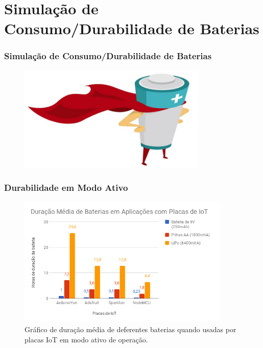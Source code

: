 \documentclass{beamer}
\begin{document}
\section{Simulação de Consumo/Durabilidade de Baterias}

\begin{frame}
	\frametitle{Simulação de Consumo/Durabilidade de Baterias}
	\begin{minipage}{\textwidth}
		\begin{figure}[!ht]
			\centering
			\includegraphics[width=0.8\textwidth]{battery-super-man.jpg}
			\label{fig:ndfsdfsdgode_dfgdpodsdswer_pins}
			\vspace{-10pt}
		\end{figure}
		
	\end{minipage}
\end{frame} 


\begin{frame}
	\frametitle{Durabilidade em Modo Ativo}
	\begin{minipage}{\textwidth}
		\begin{figure}[!ht]
			\centering
			\includegraphics[width=0.9\textwidth]{duracao_modo_ativo.png}
			\caption{Gráfico de duração média de deferentes baterias quando usadas por placas IoT em modo ativo de operação.}
			\label{fig:ndfgode_podsfsdwer_pins}
		\end{figure}
		
	\end{minipage}
\end{frame} 
\end{document}
